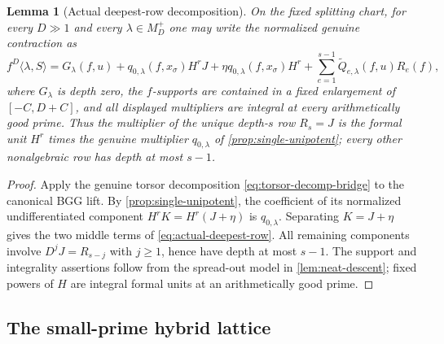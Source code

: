 \documentclass[11pt]{article}
\newtheorem{lemma}[lemma]{Lemma}
\theoremstyle{definition}
\theoremstyle{remark}
\begin{document}
\begin{lemma}[Actual deepest-row decomposition]\label{lem:actual-deepest-row}
On the fixed splitting chart, for every $D\gg1$ and every
$\lambda\in M_D^+$ one may write the normalized genuine contraction as
\begin{equation}\label{eq:actual-deepest-row}
 f^D\langle\lambda,S\rangle
 =G_\lambda(f,u)+q_{0,\lambda}(f,x_\sigma)H^rJ
  +\eta q_{0,\lambda}(f,x_\sigma)H^r
  +\sum_{e=1}^{s-1}\widetilde Q_{e,\lambda}(f,u)R_e(f),
\end{equation}
where $G_\lambda$ is depth zero, the $f$-supports are contained in a fixed
enlargement of $[-C,D+C]$, and all displayed multipliers are integral at every
arithmetically good prime.  Thus the multiplier of the unique depth-$s$ row
$R_s=J$ is the formal unit $H^r$ times the genuine multiplier
$q_{0,\lambda}$ of \cref{prop:single-unipotent}; every other nonalgebraic row
has depth at most $s-1$.
\end{lemma}

\begin{proof}
Apply the genuine torsor decomposition \eqref{eq:torsor-decomp-bridge} to the
canonical BGG lift.  By \cref{prop:single-unipotent}, the coefficient of its normalized
undifferentiated component $H^rK=H^r(J+\eta)$ is $q_{0,\lambda}$.
Separating $K=J+\eta$ gives the two middle terms of
\eqref{eq:actual-deepest-row}.  All remaining components involve
$D^jJ=R_{s-j}$ with $j\ge1$, hence have depth at most $s-1$.  The support and
integrality assertions follow from the spread-out model in
\cref{lem:neat-descent}; fixed powers of $H$ are integral formal units at an
arithmetically good prime.
\end{proof}

\subsection{The small-prime hybrid lattice}
\end{document}
